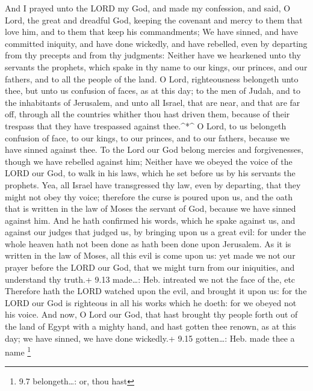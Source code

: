 And I prayed unto the LORD my God, and made my confession,
and said, O Lord, the great and dreadful God, keeping the covenant and
mercy to them that love him, and to them that keep his commandments;
 We have sinned, and have committed iniquity, and have done
wickedly, and have rebelled, even by departing from thy precepts and
from thy judgments:  Neither have we hearkened unto thy
servants the prophets, which spake in thy name to our kings, our
princes, and our fathers, and to all the people of the land.
 O Lord, righteousness belongeth unto thee, but unto us
confusion of faces, as at this day; to the men of Judah, and to the
inhabitants of Jerusalem, and unto all Israel, that are near, and that
are far off, through all the countries whither thou hast driven them,
because of their trespass that they have trespassed against
thee.\^{}*\^{}  O Lord, to us belongeth confusion of face,
to our kings, to our princes, and to our fathers, because we have sinned
against thee.  To the Lord our God belong mercies and
forgivenesses, though we have rebelled against him; 
Neither have we obeyed the voice of the LORD our God, to walk in his
laws, which he set before us by his servants the prophets. 
Yea, all Israel have transgressed thy law, even by departing, that they
might not obey thy voice; therefore the curse is poured upon us, and the
oath that is written in the law of Moses the servant of God, because we
have sinned against him.  And he hath confirmed his words,
which he spake against us, and against our judges that judged us, by
bringing upon us a great evil: for under the whole heaven hath not been
done as hath been done upon Jerusalem.  As it is written in
the law of Moses, all this evil is come upon us: yet made we not our
prayer before the LORD our God, that we might turn from our iniquities,
and understand thy truth.+ 9.13 made\ldots: Heb. intreated we not the
face of the, etc  Therefore hath the LORD watched upon the
evil, and brought it upon us: for the LORD our God is righteous in all
his works which he doeth: for we obeyed not his voice.  And
now, O Lord our God, that hast brought thy people forth out of the land
of Egypt with a mighty hand, and hast gotten thee renown, as at this
day; we have sinned, we have done wickedly.+ 9.15 gotten\ldots: Heb.
made thee a name \footnote{9.7 belongeth\ldots: or, thou hast}

